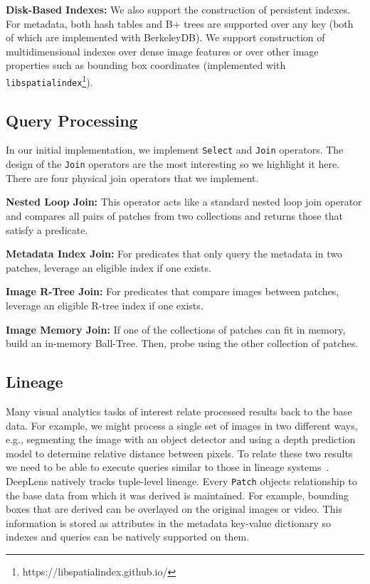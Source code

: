 \vspace{0.25em}
\noindent \textbf{Disk-Based Indexes: } We also support the construction of persistent indexes. For metadata, both hash tables and B+ trees are supported over any key (both of which are implemented with BerkeleyDB). We support construction of multidimensional indexes over dense image features or over other image properties such as bounding box coordinates (implemented with \texttt{libspatialindex}\footnote{https://libspatialindex.github.io/}).

\subsection{Query Processing}
In our initial implementation, we implement \texttt{Select} and \texttt{Join} operators. The design of the \texttt{Join} operators are the most interesting so we highlight it here. There are four physical join operators that we implement.   

\vspace{0.25em}
\noindent \textbf{Nested Loop Join: } This operator acts like a standard nested loop join operator and compares all pairs of patches from two collections and returns those that satisfy a predicate.

\vspace{0.25em}
\noindent \textbf{Metadata Index Join: } For predicates that only query the metadata in two patches, leverage an eligible index if one exists. 

\vspace{0.25em}
\noindent \textbf{Image R-Tree Join: } For predicates that compare images between patches, leverage an eligible R-tree index if one exists. 

\vspace{0.25em}
\noindent \textbf{Image Memory Join: } If one of the collections of patches can fit in memory, build an in-memory Ball-Tree. Then, probe using the other collection of patches.

\subsection{Lineage}
Many visual analytics tasks of interest relate processed results back to the base data.
For example, we might process a single set of images in two different ways, e.g., segmenting the image with an object detector and using a depth prediction model to determine relative distance between pixels.
To relate these two results we need to be able to execute queries similar to those in lineage systems~\cite{psallidas2018smoke}. 
\textsf{DeepLens} natively tracks tuple-level lineage.
Every \texttt{Patch} objects relationship to the base data from which it was derived is maintained.
For example, bounding boxes that are derived can be overlayed on the original images or video.
This information is stored as attributes in the metadata key-value dictionary so indexes and queries can be natively supported on them.
